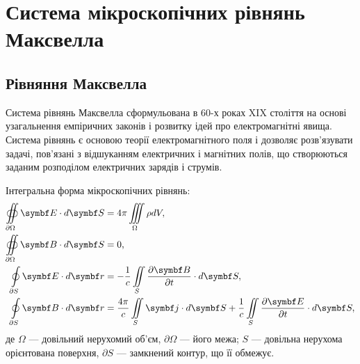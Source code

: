 
\newpage
\chapter{Система \mbox{мікроскопічних} рівнянь Максвелла}


\section{Рівняння Максвелла}

Система рівнянь Максвелла сформульована в 60-х роках XIX століття на основі узагальнення емпіричних законів і розвитку ідей про електромагнітні явища. Система рівнянь є основою теорії електромагнітного поля і дозволяє розв'язувати задачі, пов'язані з відшуканням електричних і магнітних полів, що створюються заданим розподілом електричних зарядів і струмів.

Інтегральна форма мікроскопічних рівнянь:
\begin{align}
	\oiint\limits_{\partial\Omega} \Efield\cdot d\vect{S} & = 4\pi\iiint\limits_{\Omega}\rho dV   \label{Int
	I},                                                                                                         \\
	\oiint\limits_{\partial\Omega} \Bfield\cdot d\vect{S} & = 0   \label{Int
	II},                                                                                                                                   \\
	\oint\limits_{\partial S} \Efield\cdot d\vect{r}  & = - \frac1c \iint\limits_S \frac{\partial\Bfield}{\partial t}\cdot d\vect{S}  \label{Int
	III},                                                          \\
	\oint\limits_{\partial S} \Bfield\cdot d\vect{r}  & =\dfrac{4\pi}{c} \iint\limits_S \vect{j}\cdot d\vect{S} +\frac{1}{c} \iint\limits_S
	\frac{\partial\Efield}{\partial t}\cdot d\vect{S}  \label{Int IV},
\end{align}
де $\Omega$ --- довільний нерухомий об'єм, $\partial\Omega$ --- його межа; $S$ --- довільна нерухома орієнтована поверхня, $\partial S$ --- замкнений
контур, що її обмежує.

